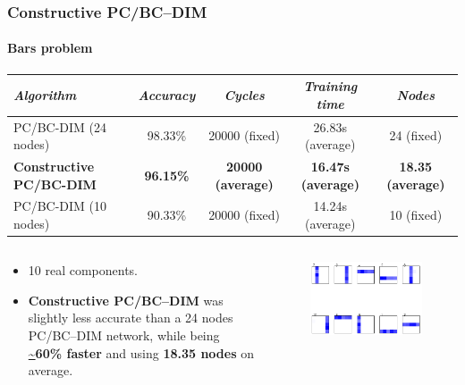 \documentclass{beamer}
\begin{document}
			\begin{frame}
				\frametitle{Constructive PC/BC--DIM}
				\framesubtitle{Bars problem}
\begin{table}[h]
	\centering
	\begin{adjustbox}{width=1\textwidth}
	\begin{tabular}{l*{4}{|c}}
		\emph{Algorithm}                & \emph{Accuracy}  & \emph{Cycles}            & \emph{Training time}      & \emph{Nodes}             \\
		\hline
		PC/BC-DIM (24 nodes)            & 98.33\%          & 20000 (fixed)            & 26.83s (average)          & 24 (fixed)               \\
		\textbf{Constructive PC/BC-DIM} & \textbf{96.15\%} & \textbf{20000 (average)} & \textbf{16.47s (average)} & \textbf{18.35 (average)} \\
		PC/BC-DIM (10 nodes)            & 90.33\%          & 20000 (fixed)            & 14.24s (average)          & 10 (fixed)               \\
	\end{tabular}
	\end{adjustbox}
\end{table}
				\begin{columns}[c]
					\begin{small}
						\begin{itemize}
							\item 10 real components.
							\item \textbf{Constructive PC/BC--DIM} was slightly less accurate than a 24 nodes PC/BC--DIM network, while being \textbf{\url{~}60\% faster} and using \textbf{18.35 nodes} on average.
						\end{itemize}
					\end{small}
					\begin{figure}[h]
						\centering
						\includegraphics[width=\textwidth]{learning_bars}
					\end{figure}
				\end{columns}
			\end{frame}
			
\end{document}
